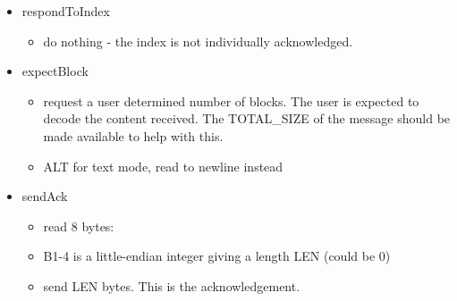 \begin{itemize}
\item respondToIndex
  \begin{itemize}
  \item do nothing - the index is not individually acknowledged.
  \end{itemize}

\item expectBlock
  \begin{itemize}
  \item request a user determined number of blocks.  The user
    is expected to decode the content received.  The TOTAL\_SIZE
    of the message should be made available to help with this.
  \item ALT for text mode, read to newline instead
  \end{itemize}

\item sendAck
  \begin{itemize}
  \item read 8 bytes: 
  \item B1-4 is a little-endian integer giving a length LEN (could be 0)
  \item send LEN bytes.  This is the acknowledgement.
  \end{itemize}
\end{itemize}













